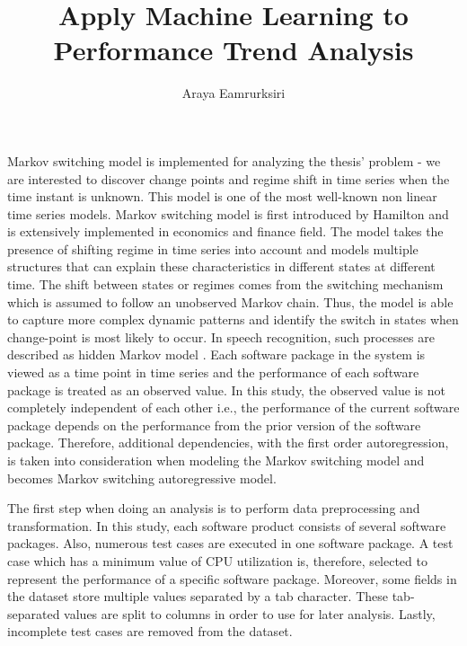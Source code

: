 \documentclass[]{article}
\title{Apply Machine Learning to Performance Trend Analysis}
\author{Araya Eamrurksiri}
\begin{document}
\date{}
\maketitle

Markov switching model is implemented for analyzing the thesis' problem - we are interested to discover change points and regime shift in time series when the time instant is unknown. This model is one of the most well-known non linear time series models. Markov switching model is first introduced by Hamilton \cite{hamilton1989new} and is extensively implemented in economics and finance field. The model takes the presence of shifting regime in time series into account and models multiple structures that can explain these characteristics in different states at different time. The shift between states or regimes comes from the switching mechanism which is assumed to follow an unobserved Markov chain. Thus, the model is able to capture more complex dynamic patterns and identify the switch in states when change-point is most likely to occur. In speech recognition, such processes are described as hidden Markov model \cite{rabiner1989tutorial}. Each software package in the system is viewed as a time point in time series and the performance of each software package is treated as an observed value. In this study, the observed value is not completely independent of each other i.e., the performance of the current software package depends on the performance from the prior version of the software package. Therefore, additional dependencies, with the first order autoregression, is taken into consideration when modeling the Markov switching model and becomes Markov switching autoregressive model.

The first step when doing an analysis is to perform data preprocessing and transformation. In this study, each software product consists of several software packages. Also, numerous test cases are executed in one software package. A test case which has a minimum value of CPU utilization is, therefore, selected to represent the performance of a specific software package. Moreover, some fields in the dataset store multiple values separated by a tab character. These tab-separated values are split to columns in order to use for later analysis. Lastly, incomplete test cases are removed from the dataset.
\end{document}
